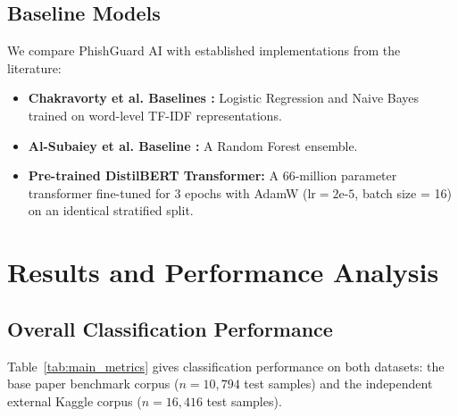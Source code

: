 \documentclass[conference]{IEEEtran}
\begin{document}
\subsection{Baseline Models}
We compare PhishGuard AI with established implementations from the literature:
\begin{itemize}
    \item \textbf{Chakravorty et al. Baselines \cite{chakravorty2026}:} Logistic Regression and Naive Bayes trained on word-level TF-IDF representations.
    \item \textbf{Al-Subaiey et al. Baseline \cite{alsubaiey2024}:} A Random Forest ensemble.
    \item \textbf{Pre-trained DistilBERT Transformer:} A 66-million parameter transformer fine-tuned for 3 epochs with AdamW ($\text{lr}=2\text{e-}5$, batch size = 16) on an identical stratified split.
\end{itemize}

\section{Results and Performance Analysis}
\label{sec:results}

\subsection{Overall Classification Performance}
Table~\ref{tab:main_metrics} gives classification performance on both datasets: the base paper benchmark corpus ($n=10{,}794$ test samples) and the independent external Kaggle corpus ($n=16{,}416$ test samples).
\end{document}
